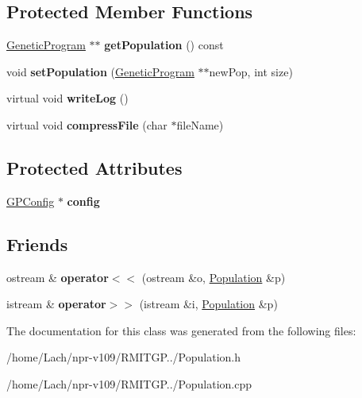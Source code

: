 \subsection*{Protected Member Functions}
\begin{DoxyCompactItemize}
\item 
\hypertarget{classPopulation_a053c12ad09287ddc2db5b17b3bab573d}{}\label{classPopulation_a053c12ad09287ddc2db5b17b3bab573d} 
\hyperlink{classGeneticProgram}{Genetic\+Program} $\ast$$\ast$ {\bfseries get\+Population} () const
\item 
\hypertarget{classPopulation_a5cebfb8e94eca66d4ec1acf6fb1ade8a}{}\label{classPopulation_a5cebfb8e94eca66d4ec1acf6fb1ade8a} 
void {\bfseries set\+Population} (\hyperlink{classGeneticProgram}{Genetic\+Program} $\ast$$\ast$new\+Pop, int size)
\item 
\hypertarget{classPopulation_a0584ecff1fbe2f0fd4bf80bbd2d4b18b}{}\label{classPopulation_a0584ecff1fbe2f0fd4bf80bbd2d4b18b} 
virtual void {\bfseries write\+Log} ()
\item 
\hypertarget{classPopulation_a29192a0c94ecf56c8e3ff0b5d91b9e32}{}\label{classPopulation_a29192a0c94ecf56c8e3ff0b5d91b9e32} 
virtual void {\bfseries compress\+File} (char $\ast$file\+Name)
\end{DoxyCompactItemize}
\subsection*{Protected Attributes}
\begin{DoxyCompactItemize}
\item 
\hypertarget{classPopulation_ac7ed1aad54d43b5ceabccb373124e51a}{}\label{classPopulation_ac7ed1aad54d43b5ceabccb373124e51a} 
\hyperlink{classGPConfig}{G\+P\+Config} $\ast$ {\bfseries config}
\end{DoxyCompactItemize}
\subsection*{Friends}
\begin{DoxyCompactItemize}
\item 
\hypertarget{classPopulation_ae3843f6ac1dc6e9943514e7f90203551}{}\label{classPopulation_ae3843f6ac1dc6e9943514e7f90203551} 
ostream \& {\bfseries operator$<$$<$} (ostream \&o, \hyperlink{classPopulation}{Population} \&p)
\item 
\hypertarget{classPopulation_a40a83a22188f62bff8f72b3d0876ebb8}{}\label{classPopulation_a40a83a22188f62bff8f72b3d0876ebb8} 
istream \& {\bfseries operator$>$$>$} (istream \&i, \hyperlink{classPopulation}{Population} \&p)
\end{DoxyCompactItemize}


The documentation for this class was generated from the following files\+:\begin{DoxyCompactItemize}
\item 
/home/\+Lach/npr-\/v109/\+R\+M\+I\+T\+G\+P../Population.\+h\item 
/home/\+Lach/npr-\/v109/\+R\+M\+I\+T\+G\+P../Population.\+cpp\end{DoxyCompactItemize}
